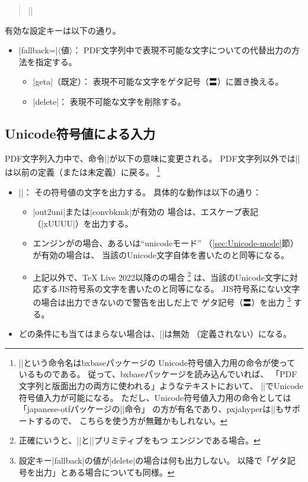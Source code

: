 \documentclass[uplatex,dvipdfmx,a4paper]{jsarticle}
\newcommand{\Pkg}[1]{\textsf{#1}}
\newcommand{\Meta}[1]{$\langle$\mbox{}#1\mbox{}$\rangle$}
\newcommand{\Means}{：\quad}
\begin{document}
\begin{quote}\small
|\pxjahypersetup{|\Meta{キー}|=|\Meta{値}|,...}|
\end{quote}

有効な設定キーは以下の通り。

\begin{itemize}
\item |fallback=|\Meta{値}\Means
  PDF文字列中で表現不可能な文字についての代替出力の方法を指定する。
  \begin{itemize}
  \item |geta|（既定）\Means
    表現不可能な文字をゲタ記号（〓）に置き換える。
  \item |delete|\Means
    表現不可能な文字を削除する。
  \end{itemize}
\end{itemize}

\subsection{Unicode符号値による入力}
\label{ssec:ux-command}

PDF文字列入力中で、命令|\Ux|が以下の意味に変更される。
PDF文字列以外では|\Ux|は以前の定義（または未定義）に戻る。
\footnote{|\Ux|という命令名は\Pkg{bxbase}パッケージの
Unicode符号値入力用の命令が使っているものである。
従って、\Pkg{bxbase}パッケージを読み込んでいれば、
「PDF文字列と版面出力の両方に使われる」ようなテキストにおいて、
|\Ux|でUnicode符号値入力が可能になる。
ただし、Unicode符号値入力用の命令としては
「\Pkg{japanese-otf}パッケージの|\UTF|命令」
の方が有名であり、\Pkg{pxjahyper}は|\UTF|もサポートするので、
こちらを使う方が無難かもしれない。}

\begin{itemize}
\item |\Ux{|\Meta{Unicode符号値16進}|}|\Means
  その符号値の文字を出力する。
  具体的な動作は以下の通り：
  \begin{itemize}
  \item |out2uni|または|convbkmk|が有効の
  場合は、エスケープ表記（|\0xUUUU|）を出力する。
  \item エンジンが{\upLaTeX}の場合、あるいは“unicodeモード”
  （\ref{sec:Unicode-mode}節）が有効の場合は、
  当該のUnicode文字自体を書いたのと同等になる。
  \item 上記以外で、{\TeX} Live 2022以降の{\pLaTeX}の場合
  \footnote{正確にいうと、|\Uchar|と|\ucs|プリミティブをもつ
    {\epTeX}エンジンである場合。}%
  は、当該のUnicode文字に対応するJIS符号系の文字を書いたのと同等になる。
  JIS符号系にない文字の場合は出力できないので警告を出しだ上で
  ゲタ記号（〓）を出力%
  \footnote{設定キー|fallback|の値が|delete|の場合は何も出力しない。
    以降で「ゲタ記号を出力」とある場合についても同様。}%
  する。
  \end{itemize}
  \item どの条件にも当てはまらない場合は、|\Ux|は無効
  （定義されない）になる。
\end{itemize}
\end{document}
